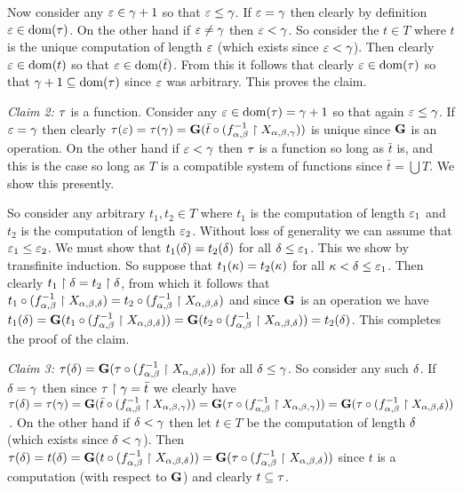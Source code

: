 \begin{solution}
    Now consider any $\varepsilon \in \gamma+1$ so that $\varepsilon \leq \gamma$.
    If $\varepsilon = \gamma$ then clearly by definition $\varepsilon \in \mathrm{dom}(\tau)$.
    On the other hand if $\varepsilon \neq \gamma$ then $\varepsilon < \gamma$.
    So consider the $t \in T$ where $t$ is the unique computation of length $\varepsilon$ (which exists since $\varepsilon < \gamma$).
    Then clearly $\varepsilon \in \mathrm{dom}(t)$ so that $\varepsilon \in \mathrm{dom}(\bar{t})$.
    From this it follows that clearly $\varepsilon \in \mathrm{dom}(\tau)$ so that $\gamma+1 \subseteq \mathrm{dom}(\tau)$ since $\varepsilon$ was arbitrary.
    This proves the claim.
    
    \emph{Claim 2:} $\tau$ is a function.
    Consider any $\varepsilon \in \mathrm{dom}(\tau) = \gamma+1$ so that again $\varepsilon \leq \gamma$.
    If $\varepsilon = \gamma$ then clearly $\tau(\varepsilon) = \tau(\gamma) = \mathbf{G}(\bar{t} \circ (f_{\alpha,\beta}^{-1} \restriction X_{\alpha,\beta,\gamma}))$ is unique since $\mathbf{G}$ is an operation.
    On the other hand if $\varepsilon < \gamma$ then $\tau$ is a function so long as $\bar{t}$ is, and this is the case so long as $T$ is a compatible system of functions since $\bar{t} = \bigcup T$.
    We show this presently.

    So consider any arbitrary $t_1, t_2 \in T$ where $t_1$ is the computation of length $\varepsilon_1$ and $t_2$ is the computation of length $\varepsilon_2$.
    Without loss of generality we can assume that $\varepsilon_1 \leq \varepsilon_2$.
    We must show that $t_1(\delta) = t_2(\delta)$ for all $\delta \leq \varepsilon_1$.
    This we show by transfinite induction.
    So suppose that $t_1(\kappa) = t_2(\kappa)$ for all $\kappa < \delta \leq \varepsilon_1$.
    Then clearly $t_1 \restriction \delta = t_2 \restriction \delta$, from which it follows that $t_1 \circ (f_{\alpha,\beta}^{-1} \restriction X_{\alpha,\beta,\delta}) = t_2 \circ (f_{\alpha,\beta}^{-1} \restriction X_{\alpha,\beta,\delta})$ and since $\mathbf{G}$ is an operation we have $t_1(\delta) = \mathbf{G}(t_1 \circ (f_{\alpha,\beta}^{-1} \restriction X_{\alpha,\beta,\delta})) = \mathbf{G}(t_2 \circ (f_{\alpha,\beta}^{-1} \restriction X_{\alpha,\beta,\delta})) = t_2(\delta)$.
    This completes the proof of the claim.

    \emph{Claim 3:} $\tau(\delta) = \mathbf{G}(\tau \circ (f_{\alpha,\beta}^{-1} \restriction X_{\alpha,\beta,\delta}))$ for all $\delta \leq \gamma$.
    So consider any such $\delta$.
    If $\delta = \gamma$ then since $\tau \restriction \gamma = \bar{t}$ we clearly have $\tau(\delta) = \tau(\gamma) = \mathbf{G}(\bar{t} \circ (f_{\alpha,\beta}^{-1} \restriction X_{\alpha,\beta,\gamma})) = \mathbf{G}(\tau \circ (f_{\alpha,\beta}^{-1} \restriction X_{\alpha,\beta,\gamma})) = \mathbf{G}(\tau \circ (f_{\alpha,\beta}^{-1} \restriction X_{\alpha,\beta,\delta}))$\,.
    On the other hand if $\delta < \gamma$ then let $t \in T$ be the computation of length $\delta$ (which exists since $\delta < \gamma$).
    Then $\tau(\delta) = t(\delta) = \mathbf{G}(t \circ (f_{\alpha,\beta}^{-1} \restriction X_{\alpha,\beta,\delta})) = \mathbf{G}(\tau \circ (f_{\alpha,\beta}^{-1} \restriction X_{\alpha,\beta,\delta}))$ since $t$ is a computation (with respect to $\mathbf{G}$) and clearly $t \subseteq \tau$.


\end{solution}
